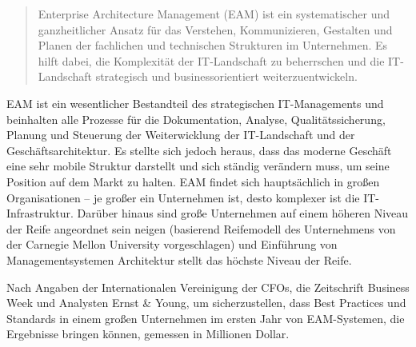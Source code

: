 \documentclass[doc]{apa6}
\begin{document}
\begin{quote}Enterprise Architecture Management (EAM) ist ein systematischer und ganzheitlicher Ansatz für das Verstehen, Kommunizieren, Gestalten und Planen der fachlichen und technischen Strukturen im Unternehmen. Es hilft dabei, die Komplexität der IT-Landschaft zu beherrschen und die IT-Landschaft strategisch und businessorientiert  weiterzuentwickeln. \autocite{Hanschke2016}
\end{quote}

EAM ist ein wesentlicher Bestandteil des strategischen IT-Managements und beinhalten alle Prozesse für die Dokumentation, Analyse, Qualitätssicherung, Planung und Steuerung der Weiterwicklung der IT-Landschaft und der Geschäftsarchitektur. Es stellte sich jedoch heraus, dass das moderne Geschäft eine sehr mobile Struktur darstellt und sich ständig verändern muss, um seine Position auf dem Markt zu halten. EAM findet sich hauptsächlich in großen Organisationen -- je großer ein Unternehmen ist, desto komplexer ist die IT-Infrastruktur. Darüber hinaus sind große Unternehmen auf einem höheren Niveau der Reife angeordnet sein neigen (basierend Reifemodell des Unternehmens von der Carnegie Mellon University vorgeschlagen) und Einführung von Managementsystemen Architektur stellt das höchste Niveau der Reife.

Nach Angaben der Internationalen Vereinigung der CFOs, die Zeitschrift Business Week und Analysten Ernst \& Young, um sicherzustellen, dass Best Practices und Standards in einem großen Unternehmen im ersten Jahr von EAM-Systemen, die Ergebnisse bringen können, gemessen in Millionen Dollar.
\end{document}
